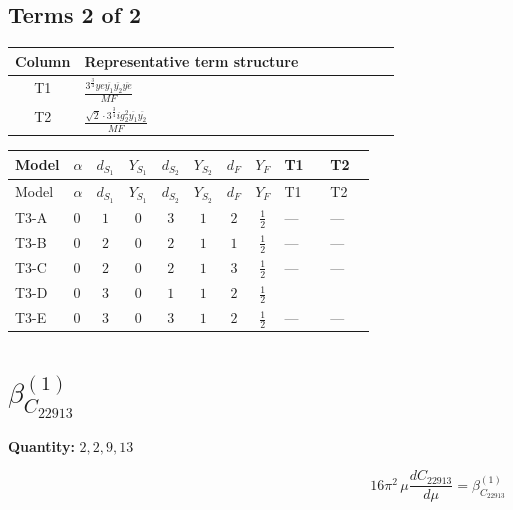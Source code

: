 \documentclass[8pt]{article}
\begin{document}
\begin{landscape}
\subsection*{Terms 2 of 2}
\begin{center}
\begin{tabular}{@{}c >{\raggedright\arraybackslash}p{0.82\linewidth}@{}}
\toprule
Column & Representative term structure \\
\midrule
T1 & \(\displaystyle \frac{3^{\frac{3}{4}} ye \overline{y_{1}} \overline{y_{2}} \overline{ye}}{MF}\) \\
\midrule
T2 & \(\displaystyle \frac{\sqrt{2} \cdot 3^{\frac{3}{4}} i g_{2}^{2} \overline{y_{1}} \overline{y_{2}}}{MF}\) \\
\midrule
\bottomrule
\end{tabular}
\end{center}
\smallskip
\tiny
\begin{longtable}{@{}llcccccc >{\raggedright\arraybackslash}p{0.21\linewidth} >{\raggedright\arraybackslash}p{0.21\linewidth}@{}}
\toprule
Model & $\alpha$ & $d_{S_1}$ & $Y_{S_1}$ & $d_{S_2}$ & $Y_{S_2}$ & $d_F$ & $Y_F$ & T1 & T2 \\
\midrule
\endfirsthead
\toprule
Model & $\alpha$ & $d_{S_1}$ & $Y_{S_1}$ & $d_{S_2}$ & $Y_{S_2}$ & $d_F$ & $Y_F$ & T1 & T2 \\
\midrule
\endhead
T3-A & $0$ & $1$ & $0$ & $3$ & $1$ & $2$ & $\frac{1}{2}$ & --- & --- \\
\midrule
T3-B & $0$ & $2$ & $0$ & $2$ & $1$ & $1$ & $\frac{1}{2}$ & --- & --- \\
\midrule
T3-C & $0$ & $2$ & $0$ & $2$ & $1$ & $3$ & $\frac{1}{2}$ & --- & --- \\
\midrule
T3-D & $0$ & $3$ & $0$ & $1$ & $1$ & $2$ & $\frac{1}{2}$ & \scriptsize\adjustbox{max width=\linewidth}{$\begin{gathered} - \frac{3^{\frac{3}{4}} ye \overline{y_{1}} \overline{y_{2}} \overline{ye}}{12 MF}\end{gathered}$} & \scriptsize\adjustbox{max width=\linewidth}{$\begin{gathered} - \frac{\sqrt{2} \cdot 3^{\frac{3}{4}} i g_{2}^{2} \overline{y_{1}} \overline{y_{2}}}{3 MF}\end{gathered}$} \\
\midrule
T3-E & $0$ & $3$ & $0$ & $3$ & $1$ & $2$ & $\frac{1}{2}$ & --- & --- \\
\midrule
\bottomrule
\end{longtable}
\clearpage
\section*{$\beta_{C_{22913}}^{(1)}$}
\noindent\textbf{Quantity: }$\mathrm{2,2,9,13}$\par\smallskip
\[16\pi^2\,\mu\frac{d C_{22913}}{d\mu}=\beta_{C_{22913}}^{(1)}\]

\end{landscape}
\end{document}
